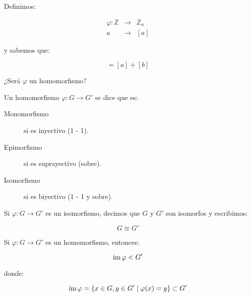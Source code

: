         \begin{ejercicio}
            Definimos:

            \begin{eqnarray*}
                \varphi \colon \mathbb{Z} & \to & \mathbb{Z}_n \\
                a & \to & [a]
            \end{eqnarray*}

            y sabemos que:

            \begin{equation*}
                [a + b] = [a] + [b]
            \end{equation*}

            ¿Será $\varphi$ un homomorfismo?
        \end{ejercicio}

        \begin{definicion}
            Un homomorfismo $\varphi \colon G \to G'$ se dice que es:

            \begin{description}
                \item[Monomorfismo] si es inyectivo (1 - 1).
                \item[Epimorfismo] si es suprayectivo (sobre).
                \item[Isomorfismo] si es biyectivo (1 - 1 y sobre).
            \end{description}
        \end{definicion}

        \begin{definicion}
            Si $\varphi \colon G \to G'$ es un isomorfismo, decimos que $G$ y $G'$ son isomorfos y escribimos:

            \begin{equation}
                G \cong G'
            \end{equation}
        \end{definicion}

        \begin{proposicion}
            Si $\varphi \colon G \to G'$ es un homomorfismo, entonces:

            \begin{equation}
                \operatorname{im}{\varphi} < G'
            \end{equation}

            donde:

            \begin{equation}
                \operatorname{im}{\varphi} = \left\{ x \in G, y \in G' \mid \varphi(x) = y \right\} \subset G'
            \end{equation}
        \end{proposicion}

